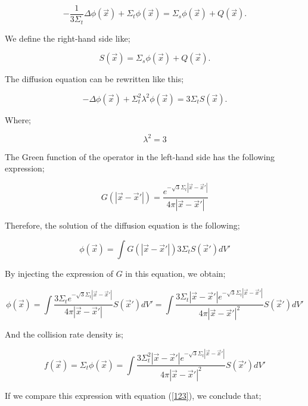 \documentclass[a4paper, 12pt]{report}
\begin{document}
\begin{equation}
-\frac{1}{3\Sigma_t}\Delta \phi(\vec{x}) + \Sigma_t \phi (\vec{x}) = \Sigma_s \phi (\vec{x}) + Q(\vec{x}).
\end{equation}

We define the right-hand side like;

\begin{equation}
S(\vec{x}) = \Sigma_s \phi (\vec{x}) + Q(\vec{x}).
\end{equation}

The diffusion equation can be rewritten like this;

\begin{equation}
-\Delta \phi(\vec{x}) + \Sigma_t^2 \lambda^2 \phi (\vec{x}) = 3\Sigma_t S(\vec{x}).
\end{equation}

Where;

$$\lambda^2 = 3$$

The Green function of the operator in the left-hand side has the following expression;

\begin{equation}
G(|\vec{x}-\vec{x}'|) = \frac{e^{-\sqrt{3}\Sigma_t|\vec{x}-\vec{x}'|}}{4\pi |\vec{x}-\vec{x}'|}
\end{equation}

Therefore, the solution of the diffusion equation is the following;

\begin{equation}
\phi(\vec{x}) = \int G(|\vec{x}-\vec{x}'|) 3 \Sigma_t S(\vec{x}') dV'
\end{equation}

By injecting the expression of $G$ in this equation, we obtain;

\begin{equation}
\phi(\vec{x}) = \int \frac{3\Sigma_t e^{-\sqrt{3}\Sigma_t|\vec{x}-\vec{x}'|}}{4\pi |\vec{x}-\vec{x}'|} S(\vec{x}')dV' = \int \frac{3\Sigma_t |\vec{x}-\vec{x}'| e^{-\sqrt{3}\Sigma_t|\vec{x}-\vec{x}'|}}{4\pi |\vec{x}-\vec{x}'|^2} S(\vec{x}') dV'
\end{equation}

And the collision rate density is;

\begin{equation}
f(\vec{x}) = \Sigma_t \phi(\vec{x}) = \int \frac{3\Sigma_t^2 |\vec{x}-\vec{x}'| e^{-\sqrt{3}\Sigma_t|\vec{x}-\vec{x}'|}}{4\pi |\vec{x}-\vec{x}'|^2} S(\vec{x}') dV'
\end{equation}

If we compare this expression with equation (\ref{123}), we conclude that;
\end{document}
